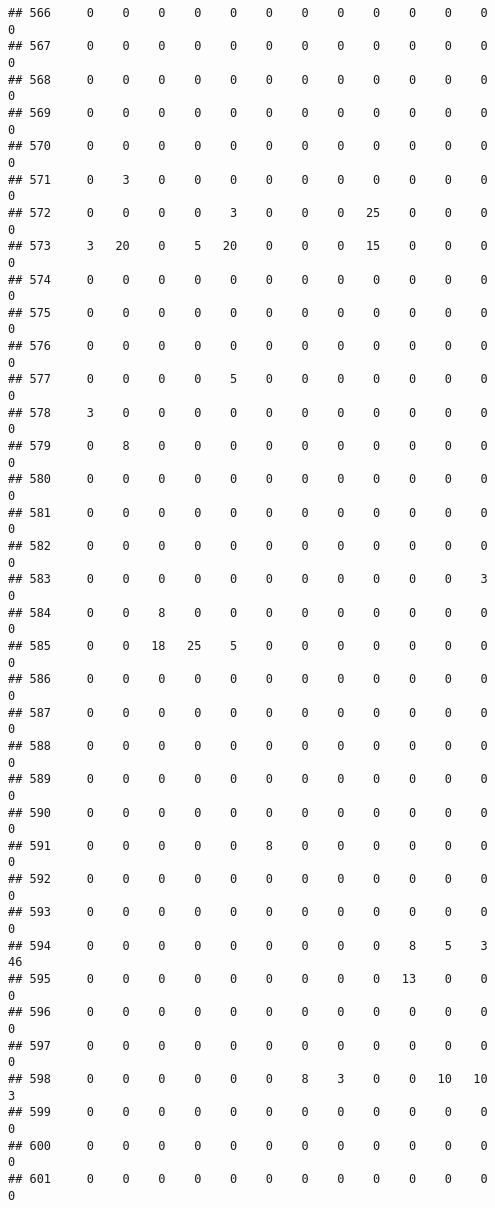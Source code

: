 \documentclass[]{article}
\begin{document}
\begin{verbatim}
## 566     0    0    0    0    0    0    0    0    0    0    0    0    0
## 567     0    0    0    0    0    0    0    0    0    0    0    0    0
## 568     0    0    0    0    0    0    0    0    0    0    0    0    0
## 569     0    0    0    0    0    0    0    0    0    0    0    0    0
## 570     0    0    0    0    0    0    0    0    0    0    0    0    0
## 571     0    3    0    0    0    0    0    0    0    0    0    0    0
## 572     0    0    0    0    3    0    0    0   25    0    0    0    0
## 573     3   20    0    5   20    0    0    0   15    0    0    0    0
## 574     0    0    0    0    0    0    0    0    0    0    0    0    0
## 575     0    0    0    0    0    0    0    0    0    0    0    0    0
## 576     0    0    0    0    0    0    0    0    0    0    0    0    0
## 577     0    0    0    0    5    0    0    0    0    0    0    0    0
## 578     3    0    0    0    0    0    0    0    0    0    0    0    0
## 579     0    8    0    0    0    0    0    0    0    0    0    0    0
## 580     0    0    0    0    0    0    0    0    0    0    0    0    0
## 581     0    0    0    0    0    0    0    0    0    0    0    0    0
## 582     0    0    0    0    0    0    0    0    0    0    0    0    0
## 583     0    0    0    0    0    0    0    0    0    0    0    3    0
## 584     0    0    8    0    0    0    0    0    0    0    0    0    0
## 585     0    0   18   25    5    0    0    0    0    0    0    0    0
## 586     0    0    0    0    0    0    0    0    0    0    0    0    0
## 587     0    0    0    0    0    0    0    0    0    0    0    0    0
## 588     0    0    0    0    0    0    0    0    0    0    0    0    0
## 589     0    0    0    0    0    0    0    0    0    0    0    0    0
## 590     0    0    0    0    0    0    0    0    0    0    0    0    0
## 591     0    0    0    0    0    8    0    0    0    0    0    0    0
## 592     0    0    0    0    0    0    0    0    0    0    0    0    0
## 593     0    0    0    0    0    0    0    0    0    0    0    0    0
## 594     0    0    0    0    0    0    0    0    0    8    5    3   46
## 595     0    0    0    0    0    0    0    0    0   13    0    0    0
## 596     0    0    0    0    0    0    0    0    0    0    0    0    0
## 597     0    0    0    0    0    0    0    0    0    0    0    0    0
## 598     0    0    0    0    0    0    8    3    0    0   10   10    3
## 599     0    0    0    0    0    0    0    0    0    0    0    0    0
## 600     0    0    0    0    0    0    0    0    0    0    0    0    0
## 601     0    0    0    0    0    0    0    0    0    0    0    0    0

\end{verbatim}
\end{document}
